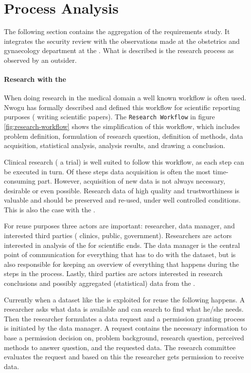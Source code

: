 \section{Process Analysis}
\label{process-analysis}

The following section contains the aggregation of the requirements study.
It integrates the security review with the observations made at the obstetrics and gynaecology department at the \AMC{}.
What is described is the research process as observed by an outsider.

\paragraph{Research with the \projectdata{}}

When doing research in the medical domain a well known workflow is often used. Nwogu \cite{nwogu} has formally described and defined this workflow for scientific reporting purposes (\ie{} writing scientific papers).
The {\tt Research Workflow} in figure \ref{fig:research-workflow} shows the simplification of this workflow, which includes problem definition, formulation of research question, definition of methods, data acquisition, statistical analysis, analysis results, and drawing a conclusion.

Clinical research (\eg{} a trial) is well suited to follow this workflow, as each step can be executed in turn.
Of these steps data acquisition is often the most time-consuming part.
However, acquisition of new data is not always necessary,  desirable or even possible. 
Research data of high quality and trustworthiness is valuable and should be preserved and re-used, under well controlled conditions. 
This is also the case with the \projectdata{}.

For reuse purposes three actors are important: researcher, data manager, and interested third parties (\eg{} clinics, public, government).
Researchers are actors interested in analysis of the \projectdata{} for scientific ends.
The data manager is the central point of communication for everything that has to do with the dataset, but is also responsible for keeping an overview of everything that happens during the steps in the process.
Lastly, third parties are actors interested in research conclusions and possibly aggregated (statistical) data from the \projectdata{}.

Currently when a dataset like the \projectdata{} is exploited for reuse the following happens.
A researcher asks what data is available and can search to find what he/she needs.
Then the researcher formulates a data request and a permission granting process is initiated by the data manager.
A request contains the necessary information to base a permission decision on, \eg{} problem background, research question, perceived methods to answer question, and the requested data.
The research committee evaluates the request and based on this the researcher gets permission to receive data.


